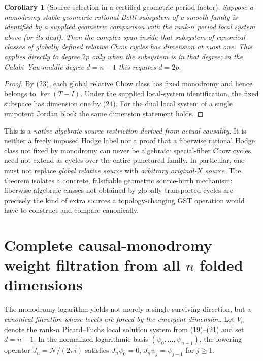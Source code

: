 \documentclass[11pt]{article}
\newtheorem{corollary}{Corollary}
\begin{document}
\begin{corollary}[Source selection in a certified geometric period factor]
Suppose a monodromy-stable geometric rational Betti subsystem of a
smooth family is \emph{identified by a supplied geometric comparison}
with the rank-$n$ period local system above (or its dual).
Then the complex span inside that subsystem of canonical
classes of \emph{globally defined relative Chow cycles}
has dimension at most one.
This applies directly to degree $2p$ only when the subsystem
is in that degree; in the Calabi--Yau middle degree $d=n-1$
this requires $d=2p$.
\end{corollary}
\begin{proof}
By (23), each global relative Chow class has fixed monodromy
and hence belongs to $\ker(T-I)$.
Under the supplied local-system identification,
the fixed subspace has dimension one by (24).
For the dual local system of a single unipotent
Jordan block the same dimension statement holds.
\end{proof}

This is a \emph{native algebraic source restriction
derived from actual causality}.
It is neither a freely imposed Hodge label nor a
proof that a fiberwise rational Hodge class not fixed by
monodromy can never be algebraic: special-fiber Chow
cycles need not extend as cycles over the entire
punctured family. In particular, one must not
replace \emph{global relative source} with
\emph{arbitrary original-$X$ source}.
The theorem isolates a concrete, falsifiable
geometric source-birth mechanism: fiberwise
algebraic classes not obtained by globally
transported cycles are precisely the kind of
extra sources a topology-changing GST operation
would have to construct and compare canonically.


\section{Complete causal-monodromy weight filtration from all $n$ folded dimensions}

The monodromy logarithm yields not merely a single surviving
direction, but a \emph{canonical filtration whose levels are forced
by the emergent dimension}. Let $V_n$ denote the rank-$n$
Picard--Fuchs local solution system from (19)--(21) and set
$d=n-1$. In the normalized logarithmic basis
$(\psi_0,\ldots,\psi_{n-1})$, the lowering operator
$J_n=\mathcal N/(2\pi i)$ satisfies
$J_n\psi_0=0$, $J_n\psi_j=\psi_{j-1}$ for $j\ge1$.
\end{document}
